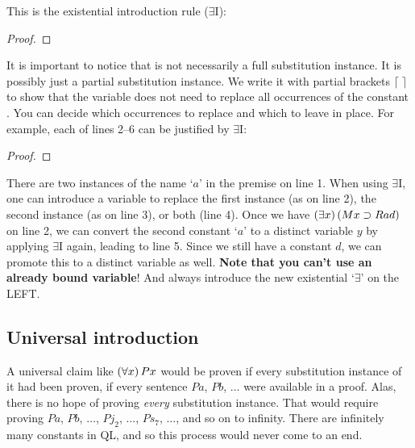 This is the existential introduction rule ($\exists$I):

\begin{proof}
	 
\end{proof}

It is important to notice that \metaA{} is not necessarily a full substitution instance. It is possibly just a partial substitution instance. We write it with partial brackets $\lceil \; \rceil$ to show that the variable  does not need to replace all occurrences of the constant . You can decide which occurrences to replace and which to leave in place. For example, each of lines 2--6 can be justified by $\exists${}I:

\begin{proof}
	 \pr{}
	 
	 
	 
	 
	 
\end{proof}

There are two instances of the name `$a$' in the premise on line 1. When using $\exists${}I, one can introduce a variable to replace the first instance (as on line 2), the second instance (as on line 3), or both (line 4). Once we have $(\exists x) \,(Mx \supset Rad)$ on line 2, we can convert the second constant `$a$' to a distinct variable $y$ by applying $\exists${}I again, leading to line 5. Since we still have a constant $d$, we can promote this to a distinct variable as well. \textbf{Note that you can't use an already bound variable}! And always introduce the new existential `$\exists$' on the LEFT. 


\subsection{Universal introduction}
A universal claim like $(\forall x) \, Px$ would be proven if {every} substitution instance of it had been proven, if every sentence $Pa$, $Pb$, $\ldots$ were available in a proof. Alas, there is no hope of proving \emph{every} substitution instance. That would require proving $Pa$, $Pb$, $\ldots$, $Pj_2$, $\ldots$, $Ps_7$, $\ldots$, and so on to infinity. There are infinitely many constants in QL, and so this process would never come to an end.

